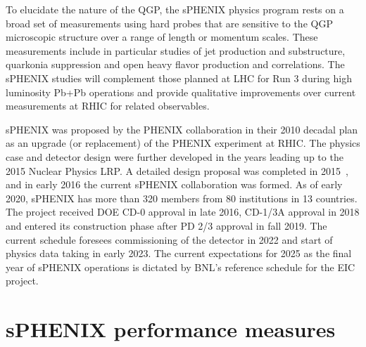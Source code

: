 To elucidate the nature of the QGP, the sPHENIX physics program rests on a broad set of measurements using hard probes that are sensitive to the QGP microscopic structure over a range of length or momentum scales. These measurements include in particular studies of jet production and substructure, quarkonia suppression and open heavy flavor production and correlations. The sPHENIX studies will complement those planned at LHC for Run 3 during high luminosity Pb+Pb operations and provide qualitative improvements over current measurements at RHIC for related observables.

sPHENIX was proposed by the PHENIX collaboration in their 2010 decadal plan as an upgrade (or replacement) of the PHENIX experiment at RHIC. The physics case and detector design were further developed in the years leading up to the 2015 Nuclear Physics LRP. A detailed design proposal was completed in 2015~\cite{sPHENIX:2015irh}, and in early 2016 the current sPHENIX collaboration was formed. As of early 2020, sPHENIX has more than 320 members from 80 institutions in 13 countries. The project received DOE CD-0 approval in late 2016, CD-1/3A approval in 2018 and entered its construction phase after PD 2/3 approval in fall 2019. The current schedule foresees commissioning of the detector in 2022 and start of physics data taking in early 2023. The current expectations for 2025 as the final year of sPHENIX operations is dictated by BNL's reference schedule for the EIC project.

\section{sPHENIX performance measures}

